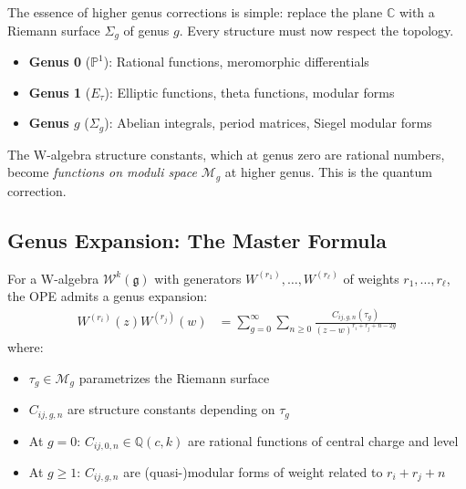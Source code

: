 \begin{remark}
The essence of higher genus corrections is simple: replace the plane $\mathbb{C}$ with a 
Riemann surface $\Sigma_g$ of genus $g$. Every structure must now respect the topology.

\begin{itemize}
\item \textbf{Genus 0} ($\mathbb{P}^1$): Rational functions, meromorphic differentials
\item \textbf{Genus 1} ($E_\tau$): Elliptic functions, theta functions, modular forms
\item \textbf{Genus $g$} ($\Sigma_g$): Abelian integrals, period matrices, Siegel modular forms
\end{itemize}

The W-algebra structure constants, which at genus zero are rational numbers, become 
\emph{functions on moduli space} $\mathcal{M}_g$ at higher genus. This is the quantum correction.
\end{remark}

\subsection{Genus Expansion: The Master Formula}

\begin{theorem}\label{thm:w-algebra-genus}
For a W-algebra $\mathcal{W}^k(\mathfrak{g})$ with generators $W^{(r_1)}, \ldots, W^{(r_\ell)}$ 
of weights $r_1, \ldots, r_\ell$, the OPE admits a genus expansion:
\begin{align}
W^{(r_i)}(z) W^{(r_j)}(w) &= \sum_{g=0}^\infty \sum_{n \geq 0} \frac{C_{ij,g,n}(\tau_g)}{(z-w)^{r_i + r_j + n - 2g}} 
\end{align}
where:
\begin{itemize}
\item $\tau_g \in \mathcal{M}_g$ parametrizes the Riemann surface
\item $C_{ij,g,n}$ are structure constants depending on $\tau_g$
\item At $g=0$: $C_{ij,0,n} \in \mathbb{Q}(c,k)$ are rational functions of central charge and level
\item At $g \geq 1$: $C_{ij,g,n}$ are (quasi-)modular forms of weight related to $r_i + r_j + n$
\end{itemize}
\end{theorem}

